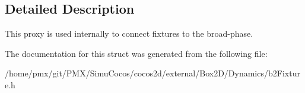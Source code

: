 \subsection{Detailed Description}
This proxy is used internally to connect fixtures to the broad-\/phase. 

The documentation for this struct was generated from the following file\+:\begin{DoxyCompactItemize}
\item 
/home/pmx/git/\+P\+M\+X/\+Simu\+Cocos/cocos2d/external/\+Box2\+D/\+Dynamics/b2\+Fixture.\+h\end{DoxyCompactItemize}
